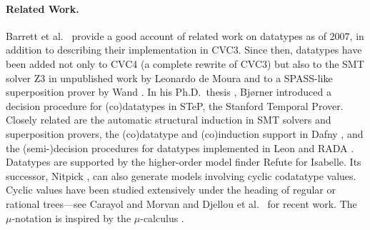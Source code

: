 \documentclass[smallcondensed,draft]{svjour3}
\begin{document}
\paragraph{Related Work.} Barrett
et al.\ \cite{barrett-et-al-2007} provide a good account of
related work on datatypes as of 2007, in addition to describing their
implementation in CVC3.
Since then, datatypes have been added not only to CVC4 (a complete rewrite of CVC3)
but also to the SMT solver
Z3 \cite{de-moura-bjoerner-2008} in unpublished work by Leonardo de Moura and to a SPASS-like %
superposition prover by Wand \cite{wand-2014}.
In his Ph.D.\ thesis \cite{bjoerner-1998}, Bj\o rner introduced a decision procedure for
(co)datatypes in STeP, the Stanford Temporal Prover.
Closely related are the automatic structural
induction in SMT solvers
\cite{reynolds-kuncak-2014}
and superposition provers\cite{kersani-peltier-2013,cruanes-2015},
the (co)datatype and (co)induction support in Dafny \cite{leino-moskal-2014},
and the (\hbox{semi-})decision procedures for datatypes
implemented in Leon \cite{suter-et-al-2011} and RADA \cite{pham-et-al-2013}.
%
Datatypes are supported by the higher-order model finder Refute
\cite{weber-2008} for Isabelle. Its successor, Nitpick
\cite{blanchette-nipkow-2010}, can also generate models involving cyclic
codatatype values. Cyclic values have been studied extensively under the heading
of regular or rational trees---see Carayol and Morvan
\cite{carayol-morvan-2006} and Djellou et al.\ \cite{djelloul-et-al-2008}
for recent work.
The $\mu$-notation is inspired by the $\mu$-calculus
\cite[etc.]{kozen-1983,endrullis-et-al-2011}.



%
\end{document}
